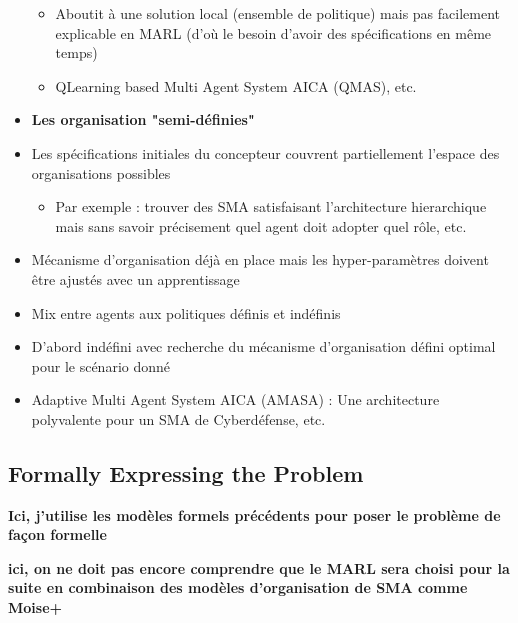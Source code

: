\begin{itemize}
\begin{itemize}
              \item Aboutit à une solution local (ensemble de politique) mais pas facilement explicable en MARL (d'où le besoin d'avoir des spécifications en même temps)
              \item QLearning based Multi Agent System AICA (QMAS), etc.
          \end{itemize}
    \item \textbf{Les organisation "semi-définies"}
    \item Les spécifications initiales du concepteur couvrent partiellement l'espace des organisations possibles
          \begin{itemize}
              \item Par exemple : trouver des SMA satisfaisant l'architecture hierarchique mais sans savoir précisement quel agent doit adopter quel rôle, etc.
          \end{itemize}
    \item Mécanisme d’organisation déjà en place mais les hyper-paramètres doivent être ajustés avec un apprentissage
    \item Mix entre agents aux politiques définis et indéfinis
    \item D’abord indéfini avec recherche du mécanisme d’organisation défini optimal pour le scénario donné
    \item Adaptive Multi Agent System AICA (AMASA) : Une architecture polyvalente pour un SMA de Cyberdéfense, etc.
\end{itemize}

\subsection{Formally Expressing the Problem}
\textbf{Ici, j'utilise les modèles formels précédents pour poser le problème de façon formelle}

\textbf{ici, on ne doit pas encore comprendre que le MARL sera choisi pour la suite en combinaison des modèles d'organisation de SMA comme Moise+}

